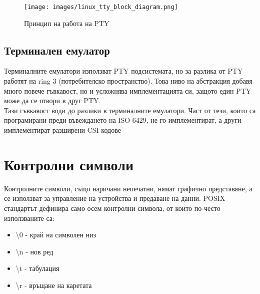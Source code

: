                 \begin{figure}[H]
                        \centering
                        \texttt{[image: images/linux\_tty\_block\_diagram.png]}
                        \caption{Принцип на работа на PTY}
                        \label{fig:linux_tty}
                \end{figure}
                \vspace{10mm}


        \subsection{Терминален емулатор}
                Терминалните емулатори използват PTY подсистемата, но за 
                разлика от PTY работят на ring 3 (потребителско пространство). 
                Това ниво на абстракция добавя много повече гъвкавост, но и 
                усложнява имплементацията си, защото един PTY може да се отвори
                в друг PTY. \\
                \indent{}
                Тази гъвкавост води до разлики в терминалните емулатори. Част 
                от тези, които са програмирани преди въвеждането на ISO 6429, 
                не го имплементират, а други имплементират разширени CSI кодове
                \\

\section{Контролни символи}
        Контролните символи, също наричани непечатни, нямат графично 
        представяне, а се използват за управление на устройства и предаване на 
        данни. POSIX стандартът дефинира само осем контролни символа, от които 
        по-често използваните са:
        \begin{itemize}
                \item \large \textbackslash 0 - край на символен низ 
                \item \large \textbackslash n - нов ред
                \item \large \textbackslash t - табулация
                \item \large \textbackslash r - връщане на каретата
        \end{itemize}
        \vspace{10mm}

